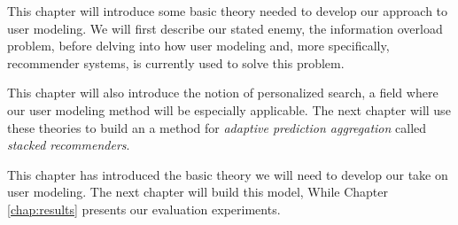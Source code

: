 \label{chap:theory}

This chapter will introduce some basic theory needed to develop our approach to user modeling.
We will first describe our stated enemy, the information overload problem, before delving into
how user modeling and, more specifically, recommender systems, is currently used to solve this problem.

This chapter will also introduce the notion of personalized search, a field where
our user modeling method will be especially applicable.
The next chapter will use these theories to build an 
a method for \emph{adaptive prediction aggregation}
called \emph{stacked recommenders}.






 
\hr

This chapter has introduced the basic theory we will need to develop our take on user modeling.
The next chapter will build this model,
While Chapter \ref{chap:results} presents our evaluation experiments.


